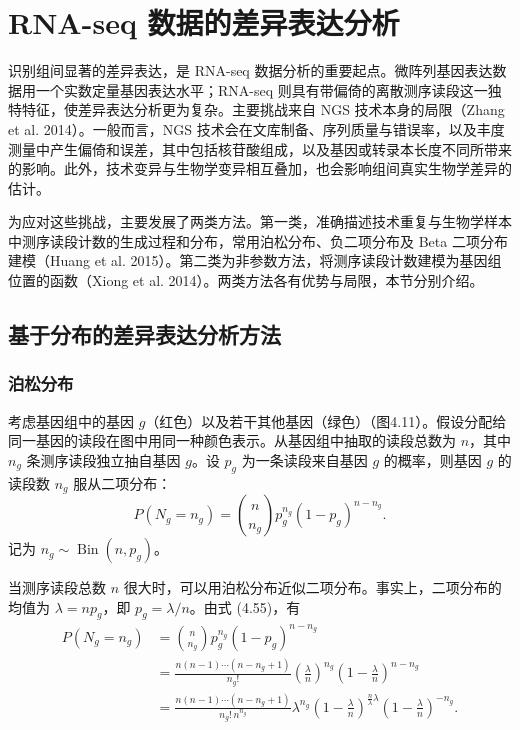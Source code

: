 \section{RNA-seq 数据的差异表达分析}

识别组间显著的差异表达，是 RNA-seq 数据分析的重要起点。微阵列基因表达数据用一个实数定量基因表达水平；RNA-seq 则具有带偏倚的离散测序读段这一独特特征，使差异表达分析更为复杂。主要挑战来自 NGS 技术本身的局限（Zhang et al. 2014）。一般而言，NGS 技术会在文库制备、序列质量与错误率，以及丰度测量中产生偏倚和误差，其中包括核苷酸组成，以及基因或转录本长度不同所带来的影响。此外，技术变异与生物学变异相互叠加，也会影响组间真实生物学差异的估计。

为应对这些挑战，主要发展了两类方法。第一类，准确描述技术重复与生物学样本中测序读段计数的生成过程和分布，常用泊松分布、负二项分布及 Beta 二项分布建模（Huang et al. 2015）。第二类为非参数方法，将测序读段计数建模为基因组位置的函数（Xiong et al. 2014）。两类方法各有优势与局限，本节分别介绍。

\subsection{基于分布的差异表达分析方法}
\subsubsection{泊松分布}

考虑基因组中的基因 $g$（红色）以及若干其他基因（绿色）（图4.11）。假设分配给同一基因的读段在图中用同一种颜色表示。从基因组中抽取的读段总数为 $n$，其中 $n_g$ 条测序读段独立抽自基因 $g$。设 $p_g$ 为一条读段来自基因 $g$ 的概率，则基因 $g$ 的读段数 $n_g$ 服从二项分布：
\begin{equation}
P(N_g=n_g)=\binom n{n_g}p_g^{n_g}(1-p_g)^{n-n_g}.
\tag{4.55}
\end{equation}
记为 $n_g\sim\operatorname{Bin}(n,p_g)$。

当测序读段总数 $n$ 很大时，可以用泊松分布近似二项分布。事实上，二项分布的均值为 $\lambda=np_g$，即 $p_g=\lambda/n$。由式 (4.55)，有
\begin{equation}
\begin{aligned}
P(N_g=n_g)&=\binom n{n_g}p_g^{n_g}(1-p_g)^{n-n_g}\\
&=\frac{n(n-1)\cdots(n-n_g+1)}{n_g!}
\left(\frac\lambda n\right)^{n_g}\left(1-\frac\lambda n\right)^{n-n_g}\\
&=\frac{n(n-1)\cdots(n-n_g+1)}{n_g!\,n^{n_g}}\lambda^{n_g}
\left(1-\frac\lambda n\right)^{\frac n\lambda\lambda}
\left(1-\frac\lambda n\right)^{-n_g}.
\end{aligned}
\tag{4.56}
\end{equation}


